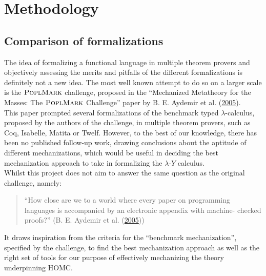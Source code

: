 \documentclass[a4paper, 12pt, twoside]{style/ociamthesis}
\theoremstyle{plain}
\theoremstyle{definition}
\theoremstyle{remark}
\newcommand{\lamy}{\lambda\text{-}Y}
\newcommand{\poplm}{\textsc{PoplMark}}
\begin{document}
\chapter{Methodology}\label{methodology}

\section{Comparison of
formalizations}\label{comparison-of-formalizations}

The idea of formalizing a functional language in multiple theorem
provers and objectively assessing the merits and pitfalls of the
different formalizations is definitely not a new idea. The most well
known attempt to do so on a larger scale is the \(\poplm\) challenge,
proposed in the ``Mechanized Metatheory for the Masses: The \(\poplm\)
Challenge'' paper by B. E. Aydemir et al.
(\protect\hyperlink{ref-aydemir05}{2005}).\\
This paper prompted several formalizations of the benchmark typed
\(\lambda\)-calculus, proposed by the authors of the challenge, in
multiple theorem provers, such as Coq, Isabelle, Matita or Twelf.
However, to the best of our knowledge, there has been no published
follow-up work, drawing conclusions about the aptitude of different
mechanizations, which would be useful in deciding the best mechanization
approach to take in formalizing the \(\lamy\) calculus.\\
Whilst this project does not aim to answer the same question as the
original challenge, namely:

\begin{quote}
``How close are we to a world where every paper on programming languages
is accompanied by an electronic appendix with machine- checked proofs?''
(B. E. Aydemir et al. (\protect\hyperlink{ref-aydemir05}{2005}))
\end{quote}

It draws inspiration from the criteria for the ``benchmark
mechanization'', specified by the challenge, to find the best
mechanization approach as well as the right set of tools for our purpose
of effectively mechanizing the theory underpinning HOMC.
\end{document}
